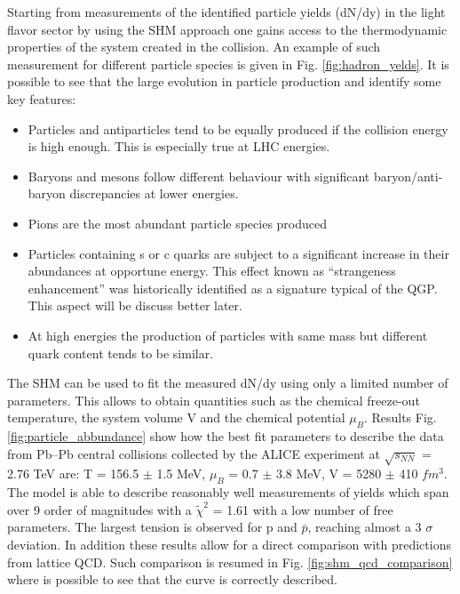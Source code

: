 \documentclass[12pt,a4paper]{book}
\begin{document}
	Starting from measurements of the identified particle yields (dN/dy) in the light flavor sector by using the SHM approach one gains access to the thermodynamic properties of the system created in the collision. An example of such measurement for different particle species is given in Fig. \ref{fig:hadron_yelds}. It is possible to see that the large evolution in particle production and identify some key features:
	\begin{itemize}
		\item  Particles and antiparticles tend to be equally produced if the collision energy is high enough. This is especially true at LHC energies.
		\item Baryons and mesons follow different behaviour with significant baryon/anti-baryon discrepancies at lower energies.
		\item  Pions are the most abundant particle species produced
		\item Particles containing s or c quarks are subject to a significant increase in their abundances at opportune energy. This effect known as “strangeness enhancement” was historically identified as a signature typical of the QGP. This aspect will be discuss better later.
		\item At high energies the production of particles with same mass but different quark content tends to be similar.
	\end{itemize}
	
	
	The SHM can be used to fit the measured dN/dy using only a limited number of parameters. This allows to obtain quantities such as the chemical freeze-out temperature, the system volume V and the chemical potential $\mu_B$. Results Fig. \ref{fig:particle_abbundance} show how the best fit parameters to describe the data from Pb–Pb central collisions collected by the ALICE experiment at $\sqrt{s_{NN}}$ = 2.76 TeV are: T = 156.5 $\pm$ 1.5 MeV, $\mu_B$ = 0.7 $\pm$ 3.8 MeV, V = 5280 $\pm$ 410 $fm^3$. The model is able to describe reasonably well measurements of yields which span over 9 order of magnitudes with a $\tilde{\chi}^2$ = 1.61 with a low number of free parameters. The largest tension is observed for p and $\bar{p}$, reaching almost a 3 $\sigma$ deviation. \cite{Andronic_2017} In addition these results allow for a direct comparison with predictions from lattice QCD. Such comparison is resumed in Fig. \ref{fig:shm_qcd_comparison} where is possible to see that the curve is correctly described.
	
\end{document}
